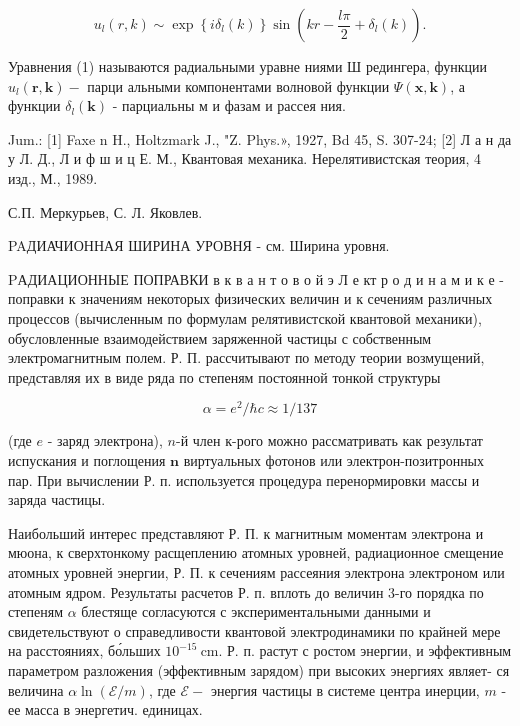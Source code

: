 \documentclass[10pt]{article}
\begin{document}
\[

u_{l}(r, k) \sim \exp \left\{i \delta_{l}(k)\right\} \sin \left(k r-\frac{l \pi}{2}+\delta_{l}(k)\right) .

\]



Уравнения (1) называются радиальными уравне ниями Ш редингера, функции $u_{l}(\boldsymbol{r}, \boldsymbol{k})-$ парци альными компонентами волновой функции $\Psi(\boldsymbol{x}, \boldsymbol{k})$, а функции $\delta_{l}(\boldsymbol{k})$ - парциальны м и фазам и рассея ния.



Jum.: [1] Faxe n H., Holtzmark J., "Z. Phys.», 1927, Bd 45, S. 307-24; [2] Л а н да у Л. Д., Л и ф ш и ц Е. М., Квантовая механика. Нерелятивистская теория, 4 изд., М., 1989.



С.П. Меркурьев, С. Л. Яковлев.



PAДИАЧИОННАЯ ШИРИНА УРОВНЯ - см. Ширина уровня.



PАДИАЦИОННЫЕ ПОПРАВКИ в к в а н т о в о й э Л е кт р о д и н а м и к е - поправки к значениям некоторых физических величин и к сечениям различных процессов (вычисленным по формулам релятивистской квантовой механики), обусловленные взаимодействием заряженной частицы с собственным электромагнитным полем. Р. П. рассчитывают по методу теории возмущений, представляя их в виде ряда по степеням постоянной тонкой структуры



\[

\alpha=e^{2} / \hbar c \approx 1 / 137

\]



(где $e$ - заряд электрона), $n$-й член к-рого можно рассматривать как результат испускания и поглощения $\boldsymbol{n}$ виртуальных фотонов или электрон-позитронных пар. При вычислении Р. п. используется процедура перенормировки массы и заряда частицы.



Наибольший интерес представляют Р. П. к магнитным моментам электрона и мюона, к сверхтонкому расщеплению атомных уровней, радиационное смещение атомных уровней энергии, Р. П. к сечениям рассеяния электрона электроном или атомным ядром. Результаты расчетов Р. п. вплоть до величин 3-го порядка по степеням $\alpha$ блестяще согласуются с экспериментальными данными и свидетельствуют о справедливости квантовой электродинамики по крайней мере на расстояниях, бо́льших $10^{-15} \mathrm{~cm}$. Р. п. растут с ростом энергии, и эффективным параметром разложения (эффективным зарядом) при высоких энергиях являет- ся величина $\alpha \ln (\mathscr{E} / m)$, где $\mathscr{E}-$ энергия частицы в системе центра инерции, $m$ - ее масса в энергетич. единицах.
\end{document}
